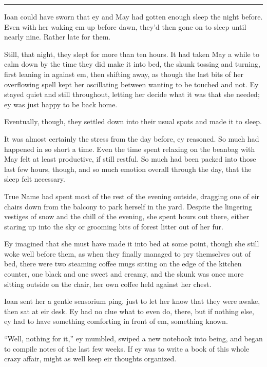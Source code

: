 \begin{center}\rule{0.5\linewidth}{0.5pt}\end{center}

Ioan could have sworn that ey and May had gotten enough sleep the night before. Even with her waking em up before dawn, they'd then gone on to sleep until nearly nine. Rather late for them.

Still, that night, they slept for more than ten hours. It had taken May a while to calm down by the time they did make it into bed, the skunk tossing and turning, first leaning in against em, then shifting away, as though the last bits of her overflowing spell kept her oscillating between wanting to be touched and not. Ey stayed quiet and still throughout, letting her decide what it was that she needed; ey was just happy to be back home.

Eventually, though, they settled down into their usual spots and made it to sleep.

It was almost certainly the stress from the day before, ey reasoned. So much had happened in so short a time. Even the time spent relaxing on the beanbag with May felt at least productive, if still restful. So much had been packed into those last few hours, though, and so much emotion overall through the day, that the sleep felt necessary.

True Name had spent most of the rest of the evening outside, dragging one of eir chairs down from the balcony to park herself in the yard. Despite the lingering vestiges of snow and the chill of the evening, she spent hours out there, either staring up into the sky or grooming bits of forest litter out of her fur.

Ey imagined that she must have made it into bed at some point, though she still woke well before them, as when they finally managed to pry themselves out of bed, there were two steaming coffee mugs sitting on the edge of the kitchen counter, one black and one sweet and creamy, and the skunk was once more sitting outside on the chair, her own coffee held against her chest.

Ioan sent her a gentle sensorium ping, just to let her know that they were awake, then sat at eir desk. Ey had no clue what to even do, there, but if nothing else, ey had to have something comforting in front of em, something known.

``Well, nothing for it,'' ey mumbled, swiped a new notebook into being, and began to compile notes of the last few weeks. If ey was to write a book of this whole crazy affair, might as well keep eir thoughts organized.

